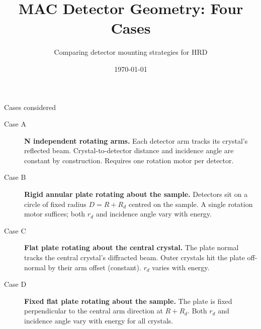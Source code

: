 \documentclass[aspectratio=169]{beamer}
\title{MAC Detector Geometry: Four Cases}
\subtitle{Comparing detector mounting strategies for HRD}
\date{\today}
\begin{document}
\begin{frame}
  \titlepage
\end{frame}

\begin{frame}{Cases considered}
  \begin{description}
    \item[Case A] \textbf{N independent rotating arms.} Each detector arm
      tracks its crystal's reflected beam.  Crystal-to-detector distance and
      incidence angle are constant by construction.  Requires one rotation
      motor per detector.

    \item[Case B] \textbf{Rigid annular plate rotating about the sample.}
      Detectors sit on a circle of fixed radius $D = R + R_d$ centred on the
      sample.  A single rotation motor suffices; both $r_d$ and incidence
      angle vary with energy.

    \item[Case C] \textbf{Flat plate rotating about the central crystal.}
      The plate normal tracks the central crystal's diffracted beam.
      Outer crystals hit the plate off-normal by their arm offset (constant).
      $r_d$ varies with energy.

    \item[Case D] \textbf{Fixed flat plate rotating about the sample.}
      The plate is fixed perpendicular to the central arm direction at
      $R + R_d$.  Both $r_d$ and incidence angle vary with energy for all
      crystals.
  \end{description}
\end{frame}
\end{document}
